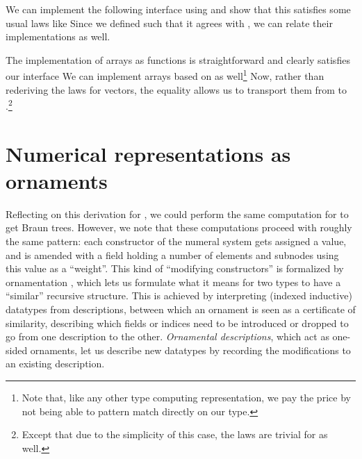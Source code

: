 We can implement the following interface using 
and show that this satisfies some usual laws like
Since we defined  such that it agrees with , we can relate their implementations as well.

The implementation of arrays as functions is straightforward
and clearly satisfies our interface
We can implement arrays based on  as well\footnote{Note that, like any other type computing representation, we pay the price by not being able to pattern match directly on our type.}
Now, rather than rederiving the laws for vectors, the equality allows us to transport them from  to .\footnote{Except that due to the simplicity of this case, the laws are trivial for  as well.}

\section{Numerical representations as ornaments}\label{sec:ornaments}
Reflecting on this derivation for \bN{}, we could perform the same computation for \bL{} to get Braun trees. However, we note that these computations proceed with roughly the same pattern: each constructor of the numeral system gets assigned a value, and is amended with a field holding a number of elements and subnodes using this value as a ``weight''. This kind of ``modifying constructors'' is formalized by ornamentation \cite{progorn}, which lets us formulate what it means for two types to have a ``similar'' recursive structure. This is achieved by interpreting (indexed inductive) datatypes from descriptions, between which an ornament is seen as a certificate of similarity, describing which fields or indices need to be introduced or dropped to go from one description to the other. \textit{Ornamental descriptions}, which act as one-sided ornaments, let us describe new datatypes by recording the modifications to an existing description.

